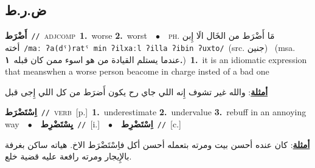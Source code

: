 \documentclass[10pt,a4paper,twoside]{article} %
\begin{document}
\begin{multicols}{2}
{{{{{{{{{{{{{{\vspace{-3mm}
\subsection*{\color{blue}\foreignlanguage{arabic}{ض.ر.ط}\color{blue}{}} 

{\setlength\topsep{0pt}\textbf{\foreignlanguage{arabic}{أَضْرَط}}\ {\color{gray}\texttt{//}\color{black}}\ \textsc{adj\textunderscore comp}\ \textbf{1.}~worse  \textbf{2.}~worst\ \ $\bullet$\ \ \textsc{ph.} \color{gray} \foreignlanguage{arabic}{مَا أَضْرَط من الخَال الَا إِبن أخته}\color{black}\ {\color{gray}\texttt{/{\sffamily maː ʔa(dˤ)ratˤ min ʔilxaːl ʔilla ʔibin ʔuxto}/}\color{black}}\ \color{gray}(src. \foreignlanguage{arabic}{جنين})\color{black}\ \color{gray} (msa. \foreignlanguage{arabic}{عندما يستلم القيادة من هو اسوء ممن كان قبله}~\foreignlanguage{arabic}{\textbf{١.}})\color{black}\ \textbf{1.}~it is an idiomatic expression that meanswhen a worse person beacome in charge insted of a bad one\  \begin{flushright}\color{gray}\foreignlanguage{arabic}{\textbf{\underline{\foreignlanguage{arabic}{أمثلة}}}: والله غير تشوف إِنه اللي جاي رح يكون أَضرَط من كل اللي إِجى قبل}\end{flushright}\color{black}} \vspace{2mm}

{\setlength\topsep{0pt}\textbf{\foreignlanguage{arabic}{اِسْتَضْرَط}}\ {\color{gray}\texttt{//}\color{black}}\ \textsc{verb}\ [p.]\ \textbf{1.}~underestimate  \textbf{2.}~undervalue  \textbf{3.}~rebuff in an annoying way\ \ $\bullet$\ \ \setlength\topsep{0pt}\textbf{\foreignlanguage{arabic}{يِسْتَضْرِط}}\ {\color{gray}\texttt{//}\color{black}}\ [i.]\ \ $\bullet$\ \ \setlength\topsep{0pt}\textbf{\foreignlanguage{arabic}{اِسْتَضْرِط}}\ {\color{gray}\texttt{//}\color{black}}\ [c.]\  \begin{flushright}\color{gray}\foreignlanguage{arabic}{\textbf{\underline{\foreignlanguage{arabic}{أمثلة}}}: كان عنده أحسن بيت ومرته بتعمله أحسن أكل فاِسْتَضْرَط الاخ. هياته ساكن بغرفة بالإِيجار ومرته رافعة عليه قضية خلع.}\end{flushright}\color{black}} \vspace{2mm}

}}}}}}}}}}}}}}
\end{multicols}
\end{document}
